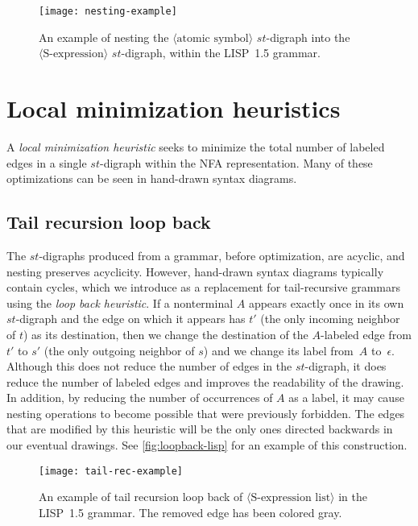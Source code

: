 \documentclass[10pt]{llncs}
\newcommand{\nonterm}[1]{\langle\text{#1}\rangle}
\begin{document}
\begin{figure}
\centering
\texttt{[image: nesting-example]}
\caption{An example of nesting the $\nonterm{atomic symbol}$ $st$-digraph into the $\nonterm{S-expression}$ $st$-digraph, within the LISP~1.5 grammar.}
\label{fig:nesting-lisp}
\end{figure}

\section{Local minimization heuristics}
A \emph{local minimization heuristic} seeks to minimize the total number of labeled edges in a single $st$-digraph within the NFA representation. Many of these optimizations can be seen in hand-drawn syntax diagrams.

\subsection{Tail recursion loop back}
The $st$-digraphs produced from a grammar, before optimization, are acyclic, and nesting preserves acyclicity. However, hand-drawn syntax diagrams typically contain cycles, which we introduce as a replacement for tail-recursive grammars using the \emph{loop back heuristic}. If a nonterminal $A$ appears exactly once in its own $st$-digraph and the edge on which it appears has $t'$ (the only incoming neighbor of $t$) as its destination, then we change the destination of the $A$-labeled edge from $t'$ to $s'$ (the only outgoing neighbor of $s$) and we change its label from~$A$ to~$\epsilon$. Although this does not reduce the number of edges in the $st$-digraph, it does reduce the number of labeled edges and improves the readability of the drawing. In addition, by reducing the number of occurrences of $A$ as a label, it may cause nesting operations to become possible that were previously forbidden. The edges that are modified by this heuristic will be the only ones directed backwards in our eventual drawings. See \autoref{fig:loopback-lisp} for an example of this construction.

\begin{figure}
\centering
\texttt{[image: tail-rec-example]}
\caption{An example of tail recursion loop back of $\nonterm{S-expression list}$ in the LISP~1.5 grammar. The removed edge has been colored gray.}
\label{fig:loopback-lisp}
\end{figure}
\end{document}

